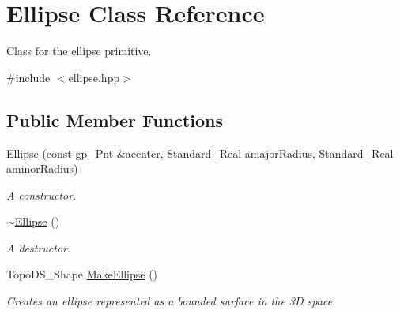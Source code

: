 \hypertarget{class_ellipse}{
\section{Ellipse Class Reference}
\label{class_ellipse}
}


Class for the ellipse primitive.  




{\ttfamily \#include $<$ellipse.hpp$>$}

\subsection*{Public Member Functions}
\begin{DoxyCompactItemize}
\item 
\hyperlink{class_ellipse_a064dd5b942b77385f8e22004226887b7}{Ellipse} (const gp\_\-Pnt \&acenter, Standard\_\-Real amajorRadius, Standard\_\-Real aminorRadius)
\begin{DoxyCompactList}\small\item\em A constructor. \item\end{DoxyCompactList}\item 
\hyperlink{class_ellipse_a94271a8a2b16101a52491b7e81e28547}{$\sim$Ellipse} ()
\begin{DoxyCompactList}\small\item\em A destructor. \item\end{DoxyCompactList}\item 
TopoDS\_\-Shape \hyperlink{class_ellipse_afa411670ee723385963ac8dec6838480}{MakeEllipse} ()
\begin{DoxyCompactList}\small\item\em Creates an ellipse represented as a bounded surface in the 3D space. \item\end{DoxyCompactList}\end{DoxyCompactItemize}
